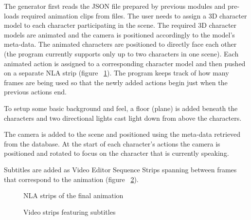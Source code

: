 The generator first reads the JSON file prepared by previous modules and pre-loads required animation clips from files. The user needs to assign a 3D character model to each character participating in the scene. The required 3D character models are animated and the camera is positioned accordingly to the model's meta-data. The animated characters are positioned to directly face each other (the program currently supports only up to two characters in one scene). Each animated action is assigned to a corresponding character model and then pushed on a separate NLA strip (figure ~\ref{fig:nla}). The program keeps track of how many frames are being used so that the newly added actions begin just when the previous actions end.

To setup some basic background and feel, a floor (plane) is added beneath the characters and two directional lights cast light down from above the characters.

The camera is added to the scene and positioned using the meta-data retrieved from the database. At the start of each character's actions the camera is positioned and rotated to focus on the character that is currently speaking.

Subtitles are added as Video Editor Sequence Strips spanning between frames that correspond to the animation (figure ~\ref{fig:substrips}).

\begin{figure}[H]
\centerline{}
\caption{NLA strips of the final animation}\label{fig:nla}
\end{figure}
\begin{figure}[H]
\centerline{}
\caption{Video strips featuring subtitles}\label{fig:substrips}
\end{figure}

